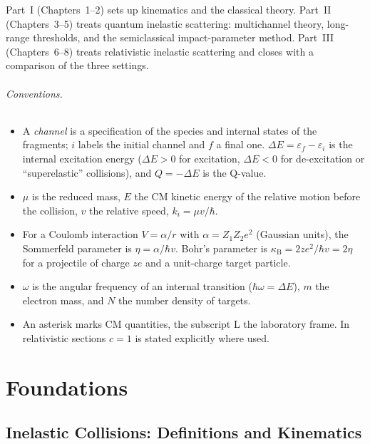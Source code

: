 \documentclass[11pt,a4paper]{book}
\numberwithin{equation}{chapter}
\newcommand{\kB}{\kappa_{\mathrm B}}
\begin{document}
Part~I (Chapters~1--2) sets up kinematics and the classical theory. Part~II
(Chapters~3--5) treats quantum inelastic scattering: multichannel theory,
long-range thresholds, and the semiclassical impact-parameter method.
Part~III (Chapters~6--8) treats relativistic inelastic scattering and closes
with a comparison of the three settings.

\paragraph{Conventions.}
\begin{itemize}
  \item A \emph{channel} is a specification of the species and internal states
        of the fragments; $i$ labels the initial channel and $f$ a final one.
        $\Delta E=\varepsilon_f-\varepsilon_i$ is the internal excitation energy
        ($\Delta E>0$ for excitation, $\Delta E<0$ for de-excitation or
        ``superelastic'' collisions), and $Q=-\Delta E$ is the Q-value.
  \item $\mu$ is the reduced mass, $E$ the CM kinetic energy of the relative
        motion before the collision, $v$ the relative speed, $k_i=\mu v/\hbar$.
  \item For a Coulomb interaction $V=\alpha/r$ with $\alpha=Z_1Z_2e^2$
        (Gaussian units), the Sommerfeld parameter is $\eta=\alpha/\hbar v$.
        Bohr's parameter is $\kB=2z e^2/\hbar v=2\eta$ for a projectile of
        charge $ze$ and a unit-charge target particle.
  \item $\omega$ is the angular frequency of an internal transition
        ($\hbar\omega=\Delta E$), $m$ the electron mass, and $N$ the number
        density of targets.
  \item An asterisk marks CM quantities, the subscript L the laboratory frame.
        In relativistic sections $c=1$ is stated explicitly where used.
\end{itemize}

\mainmatter

\part{Foundations}

\chapter{Inelastic Collisions: Definitions and Kinematics}
\end{document}
